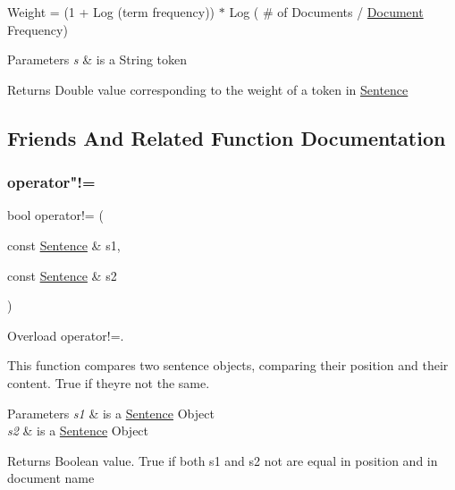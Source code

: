 Weight = (1 + Log (term frequency)) $\ast$ Log ( \# of Documents / \hyperlink{class_document}{Document} Frequency)


\begin{DoxyParams}{Parameters}
{\em s} & is a String token \\
\hline
\end{DoxyParams}
\begin{DoxyReturn}{Returns}
Double value corresponding to the weight of a token in \hyperlink{class_sentence}{Sentence} 
\end{DoxyReturn}


\subsection{Friends And Related Function Documentation}
\mbox{\label{class_sentence_a84044f682118271ebe2616b422351d9a}} 
\subsubsection{\texorpdfstring{operator"!=}{operator!=}}
{\footnotesize\ttfamily bool operator!= (\begin{DoxyParamCaption}\item[{const \hyperlink{class_sentence}{Sentence} \&}]{s1,  }\item[{const \hyperlink{class_sentence}{Sentence} \&}]{s2 }\end{DoxyParamCaption})\hspace{0.3cm}{\ttfamily [friend]}}



Overload operator!=. 

This function compares two sentence objects, comparing their position and their content. True if they\textquotesingle{}re not the same.


\begin{DoxyParams}{Parameters}
{\em s1} & is a \hyperlink{class_sentence}{Sentence} Object \\
\hline
{\em s2} & is a \hyperlink{class_sentence}{Sentence} Object \\
\hline
\end{DoxyParams}
\begin{DoxyReturn}{Returns}
Boolean value. True if both s1 and s2 not are equal in position and in document name 
\end{DoxyReturn}
\mbox{\label{class_sentence_ad954a285e5a614d6c239835d0b18aabf}} 
